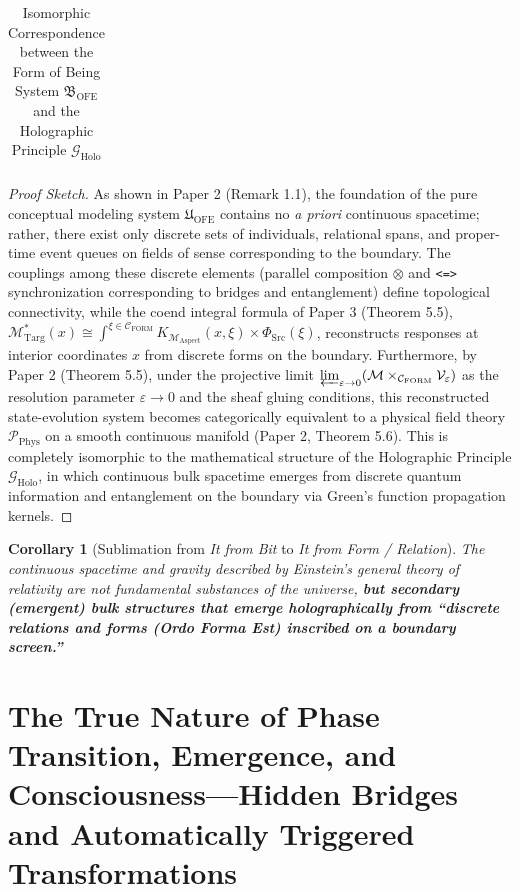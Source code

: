 \documentclass[11pt,a4paper]{article}
\theoremstyle{definition}
\theoremstyle{plain}
\newtheorem{corollary}{Corollary}[section]
\begin{document}
\begin{table}[htbp]
\begin{tabularx}{\textwidth}{@{} >{\raggedright\arraybackslash}p{} >{\raggedright\arraybackslash}p{} >{\raggedright\arraybackslash}X @{}}
\bottomrule
\end{tabularx}
\caption{Isomorphic Correspondence between the Form of Being System $\mathfrak{B}_{\mathrm{OFE}}$ and the Holographic Principle $\mathcal{G}_{\mathrm{Holo}}$}
\end{table}

\begin{proof}[Proof Sketch]
As shown in Paper 2 (Remark 1.1), the foundation of the pure conceptual modeling system $\mathfrak{U}_{\mathrm{OFE}}$ contains no \textit{a priori} continuous spacetime; rather, there exist only discrete sets of individuals, relational spans, and proper-time event queues on fields of sense corresponding to the boundary. The couplings among these discrete elements (parallel composition $\otimes$ and \texttt{<=>} synchronization corresponding to bridges and entanglement) define topological connectivity, while the coend integral formula of Paper 3 (Theorem 5.5), $\mathcal{M}_{\mathrm{Targ}}^*(x) \cong \int^{\xi \in \mathcal{C}_{\mathrm{FORM}}} K_{\mathcal{M}_{\mathrm{Aspect}}}(x, \xi) \times \Phi_{\mathrm{Src}}(\xi)$, reconstructs responses at interior coordinates $x$ from discrete forms on the boundary. Furthermore, by Paper 2 (Theorem 5.5), under the projective limit $\varprojlim_{\varepsilon \to 0} (\mathcal{M} \times_{\mathcal{C}_{\mathrm{FORM}}} \mathcal{V}_{\varepsilon})$ as the resolution parameter $\varepsilon \to 0$ and the sheaf gluing conditions, this reconstructed state-evolution system becomes categorically equivalent to a physical field theory $\mathcal{P}_{\mathrm{Phys}}$ on a smooth continuous manifold (Paper 2, Theorem 5.6). This is completely isomorphic to the mathematical structure of the Holographic Principle $\mathcal{G}_{\mathrm{Holo}}$, in which continuous bulk spacetime emerges from discrete quantum information and entanglement on the boundary via Green's function propagation kernels.
\end{proof}

\begin{corollary}[Sublimation from \textit{It from Bit} to \textit{It from Form / Relation}]
The continuous spacetime and gravity described by Einstein's general theory of relativity are not fundamental substances of the universe, \textbf{but secondary (emergent) bulk structures that emerge holographically from ``discrete relations and forms (\textit{Ordo Forma Est}) inscribed on a boundary screen.''}
\end{corollary}

\section{The True Nature of Phase Transition, Emergence, and Consciousness---Hidden Bridges and Automatically Triggered Transformations}
\end{document}
